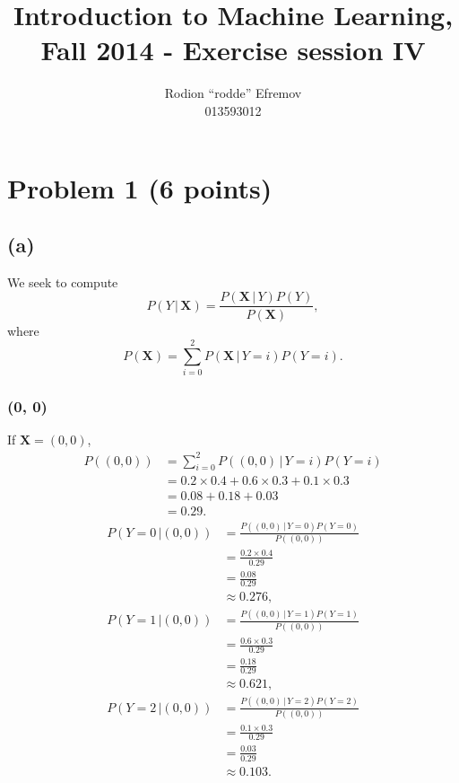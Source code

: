 \documentclass[10pt]{article}
\title{Introduction to Machine Learning, Fall 2014 - Exercise session IV}
\author{Rodion ``rodde'' Efremov \\ 013593012}
\begin{document}
 \maketitle

\section*{Problem 1 (6 points)}
\subsection*{(a)}
We seek to compute 
\[
P(Y \,| \, \textbf{X}) = \frac{P(\textbf{X} \, | \, Y) P(Y)}{P(\textbf{X})},
\]
where
\[
P(\textbf{X}) = \sum_{i = 0}^2 P(\textbf{X} \, | \, Y = i)P(Y = i).
\]
\subsubsection*{(0, 0)}
If $\textbf{X} = (0,0)$, 
\begin{align*}
P((0, 0)) &= \sum_{i = 0}^2 P((0, 0) \, | \, Y = i)P(Y = i) \\
             &= 0.2 \times 0.4 + 0.6 \times 0.3 + 0.1 \times 0.3 \\
             &= 0.08 + 0.18 + 0.03 \\
             &= 0.29.
\end{align*}
\begin{align*}
P(Y = 0 \, | (0,0)) &= \frac{P((0, 0) \, | \, Y = 0)P(Y = 0)}{P((0,0))} \\
                           &= \frac{0.2 \times 0.4}{ 0.29 } \\
                           &= \frac{0.08}{0.29} \\
                           &\approx 0.276,
\end{align*}
\begin{align*}
P(Y = 1 \, | (0,0)) &= \frac{P((0, 0) \, | \, Y = 1)P(Y = 1)}{P((0, 0))} \\
                           &= \frac{0.6 \times 0.3}{ 0.29 } \\
                           &= \frac{0.18}{0.29} \\
                           &\approx 0.621,
\end{align*}
\begin{align*}
P(Y = 2 \, | (0,0)) &= \frac{P((0, 0) \, | \, Y = 2)P(Y = 2)}{P((0, 0))} \\
                           &= \frac{0.1 \times 0.3}{ 0.29 } \\
                           &= \frac{0.03}{0.29} \\
                           &\approx 0.103.
\end{align*}
\end{document}
